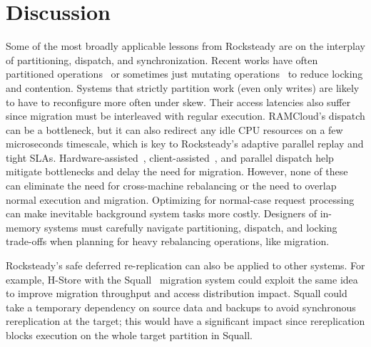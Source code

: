 \section{Discussion} 


Some of the most broadly applicable lessons from Rocksteady are on the
interplay of partitioning, dispatch, and synchronization. Recent works have
often partitioned operations~\cite{hstore,redis} or sometimes just mutating
operations~\cite{mica} to reduce locking and contention.  Systems that strictly
partition work (even only writes) are likely to have to reconfigure more often
under skew.  Their access latencies also suffer since migration must be
interleaved with regular execution.  RAMCloud's dispatch can be a bottleneck,
but it can also redirect any idle CPU resources on a few microseconds timescale,
which is key to Rocksteady's adaptive parallel replay and tight SLAs.
Hardware-assisted~\cite{flexnic}, client-assisted~\cite{mica}, and parallel dispatch help
mitigate bottlenecks and delay the need for migration. However, none of these can
eliminate the need for cross-machine rebalancing or the need to overlap normal
execution and migration.
%
Optimizing for normal-case request processing can make inevitable
background system tasks more costly.  Designers of in-memory systems must
carefully navigate partitioning, dispatch, and locking trade-offs when planning
for heavy rebalancing operations, like migration.

Rocksteady's safe deferred re-replication can also be applied to other systems.
For example, H-Store with the Squall~\cite{squall} migration system could
exploit the same idea to improve migration throughput and access distribution
impact.  Squall could take a temporary dependency on source data and backups to
avoid synchronous rereplication at the target; this would have a significant
impact since rereplication blocks execution on the whole target partition in
Squall.

%
%
%
%
%
%

